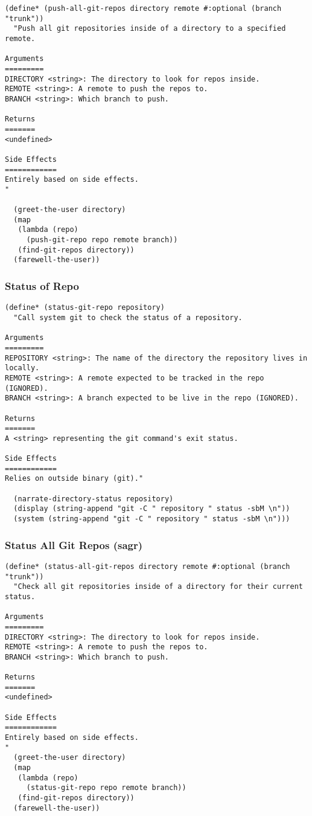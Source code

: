 \documentclass[11pt]{article}
\begin{document}
\begin{verbatim}
(define* (push-all-git-repos directory remote #:optional (branch "trunk"))
  "Push all git repositories inside of a directory to a specified remote.

Arguments
=========
DIRECTORY <string>: The directory to look for repos inside.
REMOTE <string>: A remote to push the repos to.
BRANCH <string>: Which branch to push.

Returns
=======
<undefined>

Side Effects
============
Entirely based on side effects.
"

  (greet-the-user directory)
  (map
   (lambda (repo)
     (push-git-repo repo remote branch))
   (find-git-repos directory))
  (farewell-the-user))

\end{verbatim}

\subsubsection{Status of Repo}
\label{sec:orgcac00c8}
\begin{verbatim}
(define* (status-git-repo repository)
  "Call system git to check the status of a repository.

Arguments
=========
REPOSITORY <string>: The name of the directory the repository lives in locally.
REMOTE <string>: A remote expected to be tracked in the repo (IGNORED).
BRANCH <string>: A branch expected to be live in the repo (IGNORED).

Returns
=======
A <string> representing the git command's exit status.

Side Effects
============
Relies on outside binary (git)."

  (narrate-directory-status repository)
  (display (string-append "git -C " repository " status -sbM \n"))
  (system (string-append "git -C " repository " status -sbM \n")))
\end{verbatim}

\subsubsection{Status All Git Repos (sagr)}
\label{sec:org856acac}
\begin{verbatim}
(define* (status-all-git-repos directory remote #:optional (branch "trunk"))
  "Check all git repositories inside of a directory for their current status.

Arguments
=========
DIRECTORY <string>: The directory to look for repos inside.
REMOTE <string>: A remote to push the repos to.
BRANCH <string>: Which branch to push.

Returns
=======
<undefined>

Side Effects
============
Entirely based on side effects.
"
  (greet-the-user directory)
  (map
   (lambda (repo)
     (status-git-repo repo remote branch))
   (find-git-repos directory))
  (farewell-the-user))

\end{verbatim}
\end{document}
